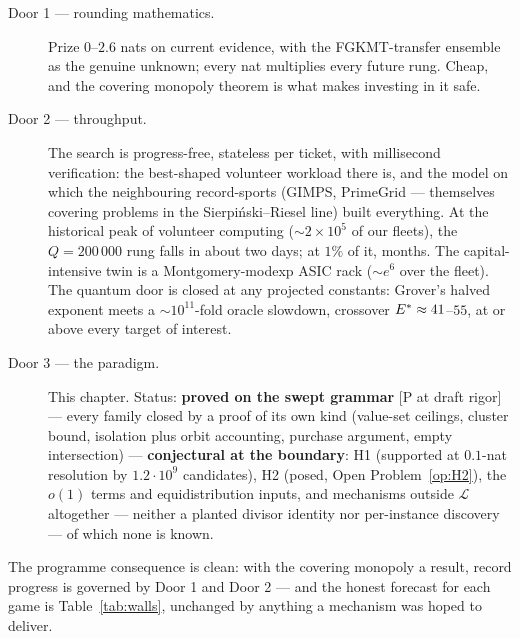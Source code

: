 \begin{description}
\item[Door 1 --- rounding mathematics.] Prize $0$--$2.6$ nats on
current evidence, with the FGKMT-transfer ensemble as the genuine
unknown; every nat multiplies every future rung. Cheap, and the
covering monopoly theorem is what makes investing in it safe.
\item[Door 2 --- throughput.] The search is progress-free, stateless
per ticket, with millisecond verification: the best-shaped volunteer
workload there is, and the model on which the neighbouring
record-sports (GIMPS, PrimeGrid --- themselves covering problems in the
Sierpi\'nski--Riesel line) built everything. At the historical peak of
volunteer computing ($\sim$$2\times10^5$ of our fleets), the
$Q=200\,000$ rung falls in about two days; at $1\%$ of it, months.
The capital-intensive twin is a Montgomery-modexp ASIC rack
($\sim$$e^6$ over the fleet). The quantum door is closed at any
projected constants: Grover's halved exponent meets a
$\sim$$10^{11}$-fold oracle slowdown, crossover $E^*\approx41$--$55$,
at or above every target of interest.
\item[Door 3 --- the paradigm.] This chapter. Status:
\textbf{proved on the swept grammar} [P at draft rigor] --- every
family closed by a proof of its own kind (value-set ceilings, cluster
bound, isolation plus orbit accounting, purchase argument, empty
intersection) --- \textbf{conjectural at the boundary}: H1 (supported
at $0.1$-nat resolution by $1.2\cdot10^9$ candidates), H2 (posed,
Open Problem~\ref{op:H2}), the $o(1)$ terms and equidistribution
inputs, and mechanisms outside $\mathcal L$ altogether --- neither a
planted divisor identity nor per-instance discovery --- of which none
is known.
\end{description}

The programme consequence is clean: with the covering monopoly a
result, record progress is governed by Door 1 and Door 2 --- and the
honest forecast for each game is Table~\ref{tab:walls}, unchanged by
anything a mechanism was hoped to deliver.
